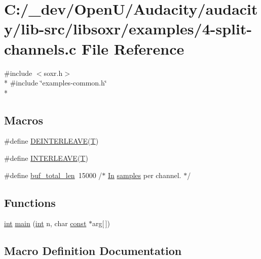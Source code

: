 \hypertarget{4-split-channels_8c}{}\section{C\+:/\+\_\+dev/\+Open\+U/\+Audacity/audacity/lib-\/src/libsoxr/examples/4-\/split-\/channels.c File Reference}
\label{4-split-channels_8c}
{\ttfamily \#include $<$soxr.\+h$>$}\\*
{\ttfamily \#include \char`\"{}examples-\/common.\+h\char`\"{}}\\*
\subsection*{Macros}
\begin{DoxyCompactItemize}
\item 
\#define \hyperlink{4-split-channels_8c_ab84936e9b3df2f292408be493ee63d98}{D\+E\+I\+N\+T\+E\+R\+L\+E\+A\+VE}(\hyperlink{xmltchar_8h_a16a0f7e7053a679c9bf4289b441a2be7}{T})
\item 
\#define \hyperlink{4-split-channels_8c_a3b15b8193f64337386cd05ba8f89b565}{I\+N\+T\+E\+R\+L\+E\+A\+VE}(\hyperlink{xmltchar_8h_a16a0f7e7053a679c9bf4289b441a2be7}{T})
\item 
\#define \hyperlink{4-split-channels_8c_a58c391d4fe581fb9e15cf5c89099f1d7}{buf\+\_\+total\+\_\+len}~15000  /$\ast$ \hyperlink{devicetopology_8h_aab6c7474a070d22bf61ccf21b532412fad8ff8dfc9381018e97fce86d909f8975}{In} \hyperlink{test__w__saw8_8c_a54185623a5a093f671a73e5fba6197a1}{samples} per channel. $\ast$/
\end{DoxyCompactItemize}
\subsection*{Functions}
\begin{DoxyCompactItemize}
\item 
\hyperlink{xmltok_8h_a5a0d4a5641ce434f1d23533f2b2e6653}{int} \hyperlink{4-split-channels_8c_a2948288d5a202a7f1bec9085b62efce2}{main} (\hyperlink{xmltok_8h_a5a0d4a5641ce434f1d23533f2b2e6653}{int} n, char \hyperlink{getopt1_8c_a2c212835823e3c54a8ab6d95c652660e}{const} $\ast$arg\mbox{[}$\,$\mbox{]})
\end{DoxyCompactItemize}


\subsection{Macro Definition Documentation}
